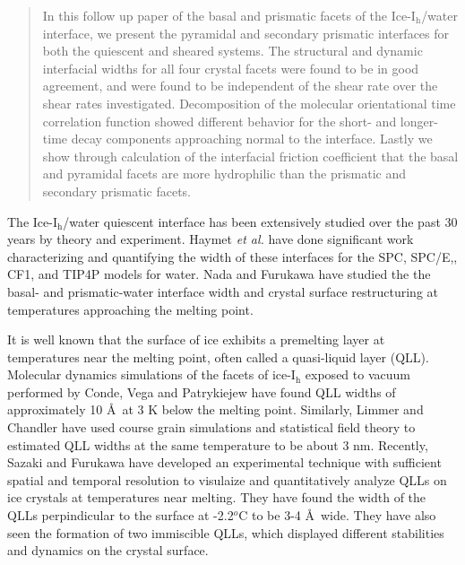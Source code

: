 \documentclass{pnastwo}
\begin{document}
\begin{article}
\begin{abstract}
{In this follow up paper of the basal and prismatic facets of the 
Ice-I$_\mathrm{h}$/water interface, we present the 
pyramidal and secondary prismatic 
interfaces for both the quiescent and sheared systems. The structural and
dynamic interfacial widths for all four crystal facets were found to be in good
agreement, and were found to be independent of the shear rate over the shear 
rates investigated. 
Decomposition of the molecular orientational time correlation function showed
different behavior for the short- and longer-time decay components approaching
normal to the interface. Lastly we show through calculation of the interfacial
friction coefficient that the basal and pyramidal facets are more 
hydrophilic than the prismatic and secondary prismatic facets.}
\end{abstract}




The Ice-I$_\mathrm{h}$/water quiescent interface has been extensively studied 
over the past 30 years by theory and experiment. Haymet \emph{et al.} have 
done significant work characterizing and quantifying the width of these 
interfaces for the SPC,\cite{Karim90} SPC/E,\cite{Gay02,Bryk02}, 
CF1,\cite{Hayward01,Hayward02} and TIP4P\cite{Karim88} models for water.\cite{Bryk04,Smith05,Wilson08,Wilson10} Nada and Furukawa have studied
the the basal- and prismatic-water interface width\cite{Nada95} and crystal 
surface restructuring at temperatures approaching the melting 
point\cite{Nada00}.

It is well known that the surface of ice exhibits a premelting layer at 
temperatures near the melting point, often called a quasi-liquid layer (QLL).
Molecular dynamics simulations of the facets of ice-I$_\mathrm{h}$ exposed
to vacuum performed by Conde, Vega and Patrykiejew have found QLL widths of
approximately 10 \AA\ at 3 K below the melting point\cite{Conde08}.
Similarly, Limmer and Chandler have used course grain simulations and 
statistical field theory to estimated QLL widths at the same temperature to
be about 3 nm\cite{Limmer14}.
Recently, Sazaki and Furukawa have developed an experimental technique with 
sufficient spatial and temporal resolution to visulaize and quantitatively
analyze QLLs on ice crystals at temperatures near melting\cite{Sazaki10}. They 
have found the width of the QLLs perpindicular to the surface  at -2.2$^{o}$C 
to be 3-4 \AA\ wide. They have also seen the formation of two immiscible
QLLs, which displayed different stabilities and dynamics on the crystal 
surface\cite{Sazaki12}. 


\end{article}
\end{document}
